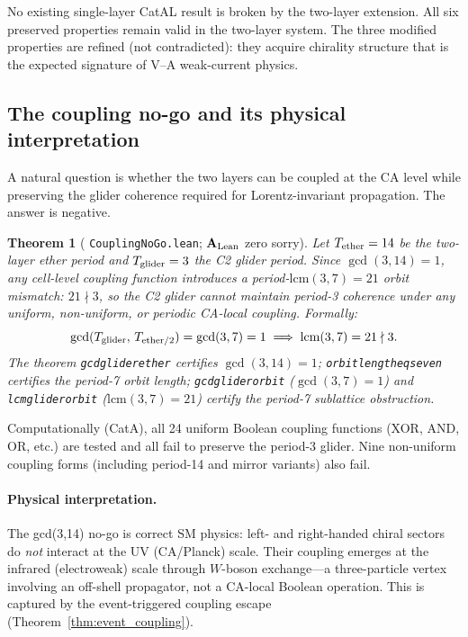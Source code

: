 \documentclass[11pt]{article}
\newtheorem{theorem}{Theorem}[section]
\theoremstyle{remark}
\newcommand{\lean}[1]{%
  \penalty-100
  \begingroup\def\_{\textunderscore\allowbreak}\texttt{#1}\endgroup}
\newcommand{\CatAL}{\ensuremath{\textbf{A}_{\rm Lean}}}
\begin{document}
No existing single-layer CatAL result is broken by the two-layer extension.
All six preserved properties remain valid in the two-layer system.
The three modified properties are refined (not contradicted): they acquire
chirality structure that is the expected signature of V--A weak-current physics.

\subsection{The coupling no-go and its physical interpretation}
\label{ssec:nogo}

A natural question is whether the two layers can be coupled at the CA level
while preserving the glider coherence required for Lorentz-invariant
propagation.  The answer is negative.

\begin{theorem}[\lean{CouplingNoGo.lean}; \CatAL{} zero sorry]
  \label{thm:nogo}
  Let $T_{\rm ether}=14$ be the two-layer ether period and $T_{\rm glider}=3$
  the C2 glider period.  Since $\gcd(3,14)=1$, any cell-level coupling
  function introduces a period-$\mathrm{lcm}(3,7)=21$ orbit mismatch:
  $21\nmid 3$, so the C2 glider cannot maintain period-3 coherence under any
  uniform, non-uniform, or periodic CA-local coupling.
  Formally:
  \begin{equation}
    \gcd(T_{\rm glider},\,T_{\rm ether/2}) = \gcd(3,7) = 1
    \;\Longrightarrow\;
    \mathrm{lcm}(3,7) = 21 \nmid 3.
  \end{equation}
  The theorem \lean{gcd\_glider\_ether} certifies $\gcd(3,14)=1$;
  \lean{orbit\_length\_eq\_seven} certifies the period-7 orbit length;
  \lean{gcd\_glider\_orbit} ($\gcd(3,7)=1$) and \lean{lcm\_glider\_orbit}
  ($\mathrm{lcm}(3,7)=21$) certify the period-7 sublattice obstruction.
\end{theorem}

\noindent Computationally (CatA), all 24 uniform Boolean coupling functions
(XOR, AND, OR, etc.) are tested and all fail to preserve the period-3 glider.
Nine non-uniform coupling forms (including period-14 and mirror variants) also
fail.

\paragraph{Physical interpretation.}
The gcd(3,14) no-go is correct SM physics: left- and right-handed chiral
sectors do \emph{not} interact at the UV (CA/Planck) scale.  Their coupling
emerges at the infrared (electroweak) scale through $W$-boson exchange---a
three-particle vertex involving an off-shell propagator, not a CA-local
Boolean operation.  This is captured by the event-triggered coupling escape
(Theorem~\ref{thm:event_coupling}).
\end{document}
